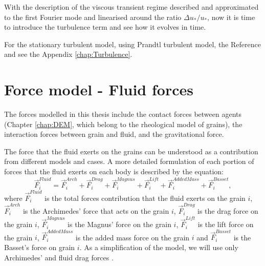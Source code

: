     With the description of the viscous transient regime described and approximated to the first Fourier mode and linearised around the ratio $\Delta u_*/u_*$, now it is time to introduce the turbulence term and see how it evolves in time.

    For the stationary turbulent model, using Prandtl turbulent model, the Reference \cite{Numerical_simulation_of_turbulent_sediment_transport} and see the Appendix \ref{chap:Turbulence}.

\section{Force model - Fluid forces}
\label{subchap:Modelo_Forcas}
    The forces modelled in this thesis include the contact forces between agents (Chapter \ref{chap:DEM}, which belong to the rheological model of grains), the interaction forces between grain and fluid, and the gravitational force. 

\label{subsubchap:Fluido}
    The force that the fluid exerts on the grains can be understood as a contribution from different models and cases. A more detailed formulation of each portion of forces that the fluid exerts on each body is described by the equation:
\begin{equation}
    \vec{F}_{i}^{Fluid} = \vec{F}_{i}^{Arch} +\vec{F}_{i}^{Drag} +\vec{F}_{i}^{Magnus} +\vec{F}_{i}^{Lift} +\vec{F}_{i}^{AddedMass} +\vec{F}_{i}^{Basset},
    \label{equ:forcas_fluido}
\end{equation}
where $\vec{F}_{i}^{Fluid}$ is the total forces contribution that the fluid exerts on the grain $i$, $\vec{F}_{i}^{Arch}$ is the Archimedes' force that acts on the grain $i$, $\vec{F}_{i}^{Drag}$ is the drag force on the grain $i$, $\vec{F}_{i}^{Magnus}$ is the Magnus' force on the grain $i$, $\vec{F}_{i}^{Lift}$ is the lift force on the grain $i$, $\vec{F}_{i}^{AddedMass}$ is the added mass force on the grain $i$ and $\vec{F}_{i}^{Basset}$ is the Basset's force on grain $i$. As a simplification of the model, we will use only Archimedes' and fluid drag forces \cite{Fluid_Mechanics, Numerical_simulation_of_turbulent_sediment_transport, Maurin-Tese}.

